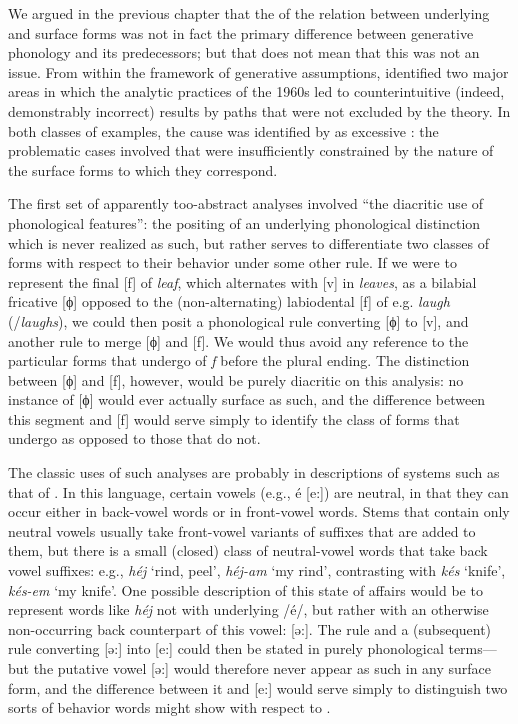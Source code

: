 We argued in the previous chapter that the  of the
relation between underlying and surface forms was not in fact the
primary difference between generative phonology and its predecessors;
but that does not mean that this  was not an issue. From
within the framework of generative assumptions, {\Kiparsky} identified
two major areas in which the analytic practices of the 1960s led to
counterintuitive (indeed, demonstrably incorrect) results by paths
that were not excluded by the theory. In both classes of examples, the
cause was identified by {\Kiparsky} as excessive : the
problematic cases involved  that were
insufficiently constrained by the nature of the surface forms to which
they correspond.

The first set of apparently too-abstract analyses involved ``the
diacritic use of phonological features'': the positing of an underlying
phonological distinction which is never realized as such, but rather
serves to differentiate two classes of forms with respect to their
behavior under some other rule. If we were to represent the final [f]
of \textit{leaf}, which alternates with [v] in \textit{leaves}, as a
bilabial fricative [ϕ] opposed to the (non-alternating) labiodental [f]
of e.g. \textit{laugh} (/\textit{laughs}), we could then posit a
phonological rule converting [ϕ] to [v], and another rule to merge [ϕ]
and [f]. We would thus avoid any reference to the particular forms
that undergo  of \emph{f} before the plural ending. The
distinction between [ϕ] and [f], however, would be purely diacritic on
this analysis: no instance of [ϕ] would ever actually surface as such,
and the difference between this segment and [f] would serve simply to
identify the class of forms that undergo  as opposed to those
that do not.

The classic uses of such analyses are probably in descriptions of
 systems such as that of . In this language,
certain vowels (e.g., é [e:]) are neutral, in that they can occur
either in back-vowel words or in front-vowel words. Stems that contain
only neutral vowels usually take front-vowel variants of suffixes that
are added to them, but there is a small (closed) class of
neutral-vowel words that take back vowel suffixes: e.g., \textit{héj}
`rind, peel', \textit{ héj-am} `my rind', contrasting with
\textit{kés} `knife', \textit{kés-em} `my knife'. One possible
description of this state of affairs would be to represent words like
\textit{héj} not with underlying /é/, but rather with an otherwise
non-occurring back counterpart of this vowel: [ə:]. The 
rule and a (subsequent) rule converting [ə:] into [e:] could then be
stated in purely phonological terms—but the putative vowel [ə:] would
therefore never appear as such in any surface form, and the difference
between it and [e:] would serve simply to distinguish two sorts of
behavior words might show with respect to .

